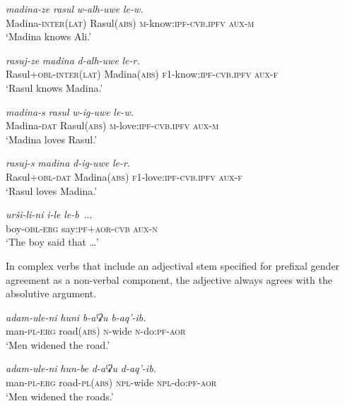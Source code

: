 ﻿\documentclass[output=paper]{langsci/langscibook}
\begin{document}
\ex %
\ea %
\gll \emph{madina-ze} \emph{rasul} \emph{w-alh-uwe} \emph{le-w.}\\
Madina-\textsc{inter(lat)} Rasul(\textsc{abs}) \textsc{m}-know:\textsc{ipf}-\textsc{cvb.ipfv} \textsc{aux}-\textsc{m}\\
\glt `Madina knows Ali.'

\ex %
\gll \emph{rasuj-ze} \emph{madina} \emph{d-alh-uwe} \emph{le-r.}\\
Rasul+\textsc{obl}-\textsc{inter(lat)} Madina(\textsc{abs}) \textsc{f1}-know:\textsc{ipf}-\textsc{cvb.ipfv} \textsc{aux}-\textsc{f}\\
\glt `Rasul knows Madina.'
\z

\ex %
\ea %
\gll \emph{madina-s} \emph{rasul} \emph{w-ig-uwe} \emph{le-w.}\\
Madina-\textsc{dat} Rasul(\textsc{abs}) \textsc{m}-love:\textsc{ipf}-\textsc{cvb.ipfv} \textsc{aux}-\textsc{m}\\
\glt `Madina loves Rasul.'

\ex %
\gll \emph{rasuj-s} \emph{madina} \emph{d-ig-uwe} \emph{le-r.}\\
Rasul+\textsc{obl}-\textsc{dat} Madina(\textsc{abs}) \textsc{f1}-love:\textsc{ipf}-\textsc{cvb.ipfv} \textsc{aux}-\textsc{f}\\
\glt `Rasul loves Madina.'
\z

\ex %
\gll \emph{urši-li-ni} \emph{i-le} \emph{le-b}~...\\
boy-\textsc{obl}-\textsc{erg} say:\textsc{pf}+\textsc{aor}-\textsc{cvb} \textsc{aux}-\textsc{n}\\
\glt `The boy said that \ldots{}'
\z

In complex verbs that include an adjectival stem specified for prefixal
gender agreement as a non-verbal component, the adjective always agrees
with the absolutive argument.

\ea %
\ea %
\gll \emph{adam-ule-ni} \emph{huni} \emph{b-aˤʡu} \emph{b-aq'-ib.}\\
man-\textsc{pl}-\textsc{erg} road(\textsc{abs}) \textsc{n}-wide \textsc{n}-do:\textsc{pf}-\textsc{aor}\\
\glt `Men widened the road.'

\ex %
\gll \emph{adam-ule-ni} \emph{hun-be} \emph{d-aˤʡu} \emph{d-aq'-ib.}\\
man-\textsc{pl}-\textsc{erg} road-\textsc{pl}(\textsc{abs}) \textsc{npl}-wide \textsc{npl}-do:\textsc{pf}-\textsc{aor}\\
\glt `Men widened the roads.'
\z
\z
\end{document}
